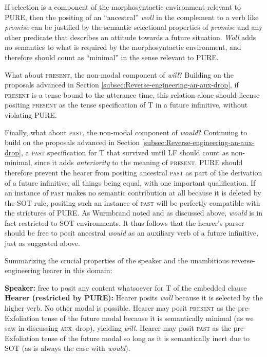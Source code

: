 \documentclass[output=paper]{langscibook}
\begin{document}
If selection is a component of the morphosyntactic environment relevant to PURE, then the positing of an “ancestral” \textit{woll }in the complement to a verb like \textit{promise }can be justified\textsc{ }by the semantic selectional properties of \textit{promise} and any other predicate that describes an attitude towards a future situation. \textit{Woll }adds no semantics to what is required by the morphosyntactic environment, and therefore should count as “minimal” in the sense relevant to PURE. 

\largerpage 
What about \textsc{present, }the non-modal component of \textit{will}? Building on the proposals advanced in Section \ref{subsec:Reverse-engineering-an-aux-drop}, if \textsc{present }is a tense bound to the utterance time, this relation alone should license positing \textsc{present }as the tense specification of T in a future infinitive, without violating PURE. 

Finally, what about \textsc{past}, the non-modal component of \textit{would}? Continuing to build on the proposals advanced in Section \ref{subsec:Reverse-engineering-an-aux-drop}, a \textsc{past }specification for T that survived until LF should count as non-minimal, since it adds\textit{ anteriority} to the meaning of \textsc{present}. PURE should therefore prevent the hearer from positing ancestral \textsc{past }as part of the derivation of a future infinitive, all things being equal, with one important qualification. If an instance of \textsc{past }makes no semantic contribution at all because it is deleted by the SOT rule, positing such an instance of \textsc{past }will be perfectly compatible with the strictures of PURE. As Wurmbrand noted and as discussed above, \textit{would} is in fact restricted to SOT environments. It thus follows that the hearer's parser should be free to posit ancestral \textit{would} as an auxiliary verb of a future infinitive, just as suggested above.

Summarizing the crucial properties of the speaker and the unambitious
reverse-engineering hearer in this domain:

\pex
{}
\medbreak
\textbf{Speaker:} free to posit any content whatsoever for T of the embedded clause
 \\[.5\baselineskip]
\textbf{Hearer (restricted by PURE):}
\a Hearer posits \textit{woll} because it is selected by the higher verb. No other modal is possible.
\a Hearer may posit \textsc{present} as the pre-Exfoliation tense of the future modal because it is semantically minimal (as we saw in discussing \textsc{aux}--drop), yielding \textit{will}.
\a Hearer may posit \textsc{past} as the pre-Exfoliation tense of the future modal so long as it is semantically inert due to SOT (as is always the case with \textit{would}).
\xe
\end{document}
